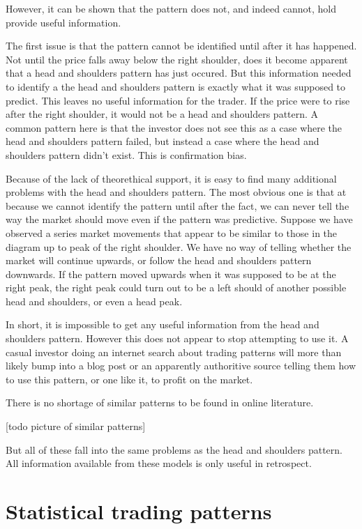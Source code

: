 \documentclass{report}
\begin{document}
However, it can be shown that the pattern does not, and indeed cannot, hold provide useful information. 

The first issue is that the pattern cannot be identified until after it has happened. Not until the price falls away below the right shoulder, does it become apparent that a head and shoulders pattern has just occured. But this information needed to identify a the head and shoulders pattern is exactly what it was supposed to predict. This leaves no useful information for the trader. If the price were to rise after the right shoulder, it would not be a head and shoulders pattern. A common pattern here is that the investor does not see this as a case where the head and shoulders pattern failed, but instead a case where the head and shoulders pattern didn't exist. This is confirmation bias.

Because of the lack of theorethical support, it is easy to find many additional problems with the head and shoulders pattern. The most obvious one is that at because we cannot identify the pattern until after the fact, we can never tell the way the market should move even if the pattern was predictive. Suppose we have observed a series market movements that appear to be similar to those in the diagram up to peak of the right shoulder. We have no way of telling whether the market will continue upwards, or follow the head and shoulders pattern downwards. If the pattern moved upwards when it was supposed to be at the right peak, the right peak could turn out to be a left should of another possible head and shoulders, or even a head peak.

In short, it is impossible to get any useful information from the head and shoulders pattern. However this does not appear to stop attempting to use it. A casual investor doing an internet search about trading patterns will more than likely bump into a blog post or an apparently authoritive source telling them how to use this pattern, or one like it, to profit on the market. 

There is no shortage of similar patterns to be found in online literature.

[todo picture of similar patterns]

But all of these fall into the same problems as the head and shoulders pattern. All information available from these models is only useful in retrospect. 

\section{Statistical trading patterns}
\end{document}
